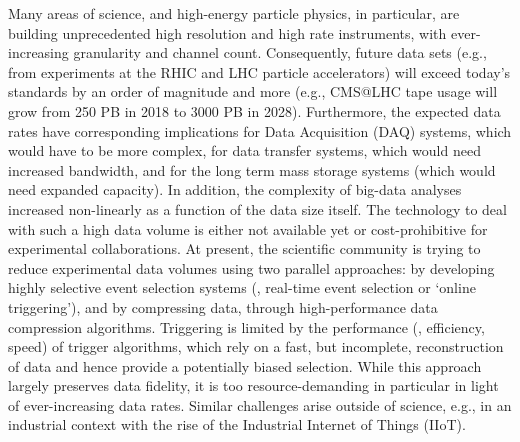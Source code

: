 Many areas of science, and high-energy particle physics, in particular, are building unprecedented high resolution and high rate instruments, with ever-increasing granularity and channel count. Consequently,  future data sets  (e.g., from experiments at the RHIC and LHC particle accelerators) will exceed today's standards by an order of magnitude and more (e.g., CMS@LHC tape usage will grow from 250 PB in 2018 to 3000 PB in 2028). Furthermore, the expected data rates have corresponding implications for  Data Acquisition (DAQ) systems, which would have to be more complex, for data transfer systems, which would need increased bandwidth, and for the long term mass storage systems (which would need expanded capacity). In addition, the complexity of big-data analyses increased non-linearly as a function of the data size itself. The technology to deal with such a high data volume is either not available yet or cost-prohibitive for experimental collaborations. At present, the scientific community is trying to reduce experimental data volumes using two parallel approaches: by developing highly selective event selection systems (\eg, real-time event selection or `online triggering'), and by compressing data, through high-performance data compression algorithms. Triggering is limited by the performance (\ie, efficiency, speed) of trigger algorithms, which rely on a fast, but incomplete, reconstruction of data and hence provide a potentially biased selection. While this approach largely preserves data fidelity, it is too resource-demanding in particular in light of ever-increasing data rates. Similar challenges arise outside of science, e.g., in an industrial context with the rise of the Industrial Internet of Things (IIoT).

